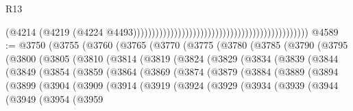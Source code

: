 \begin{lexlean}{R13}
\begin{coremodule}
                                                                                            (@4214
                                                                                              (@4219
                                                                                                (@4224
                                                                                                  @4493)))))))))))))))))))))))))))))))))))))))))))))))
@4589 := @3750
    (@3755
      (@3760
        (@3765
          (@3770
            (@3775
              (@3780
                (@3785
                  (@3790
                    (@3795
                      (@3800
                        (@3805
                          (@3810
                            (@3814
                              (@3819
                                (@3824
                                  (@3829
                                    (@3834
                                      (@3839
                                        (@3844
                                          (@3849
                                            (@3854
                                              (@3859
                                                (@3864
                                                  (@3869
                                                    (@3874
                                                      (@3879
                                                        (@3884
                                                          (@3889
                                                            (@3894
                                                              (@3899
                                                                (@3904
                                                                  (@3909
                                                                    (@3914
                                                                      (@3919
                                                                        (@3924
                                                                          (@3929
                                                                            (@3934
                                                                              (@3939
                                                                                (@3944
                                                                                  (@3949
                                                                                    (@3954
                                                                                      (@3959

\end{coremodule}
\end{lexlean}

